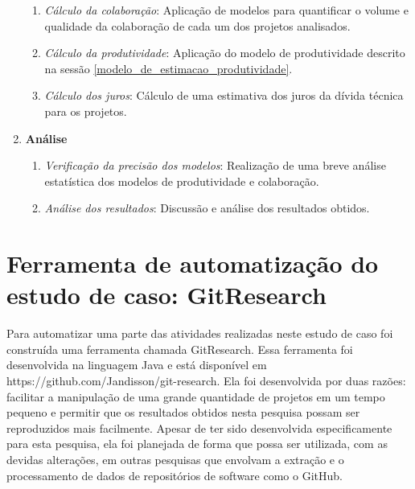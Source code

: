 \begin{enumerate}
 \begin{enumerate}
      \item \textit{Cálculo da colaboração}: Aplicação de modelos para quantificar o volume e qualidade da colaboração de cada um dos projetos analisados.
      \item \textit{Cálculo da produtividade}: Aplicação do modelo de produtividade descrito na sessão \ref{modelo_de_estimacao_produtividade}.
       \item \textit{Cálculo dos juros}: Cálculo de uma estimativa dos juros da dívida técnica para os projetos.
   \end{enumerate}
\item \textbf{Análise}
\begin{enumerate}
      \item \textit{Verificação da precisão dos modelos}: Realização de uma breve análise estatística dos modelos de produtividade e colaboração.
      \item \textit{Análise dos resultados}: Discussão e análise dos resultados obtidos.
   \end{enumerate}
\end{enumerate}


\section{Ferramenta de automatização do estudo de caso: GitResearch}
\label{cap_estudo_caso_ferramenta}


Para automatizar uma parte das atividades realizadas neste estudo de caso foi construída uma ferramenta chamada GitResearch. Essa ferramenta foi desenvolvida na linguagem Java e está disponível em https://github.com/Jandisson/git-research. Ela foi desenvolvida por duas razões: facilitar a manipulação de uma grande quantidade de projetos em um tempo pequeno e permitir que os resultados obtidos nesta pesquisa possam ser reproduzidos mais facilmente. Apesar de ter sido desenvolvida especificamente para esta pesquisa, ela foi planejada de forma que possa ser utilizada, com as devidas alterações, em outras pesquisas que envolvam a extração e o  processamento de dados de repositórios de software como o GitHub.

